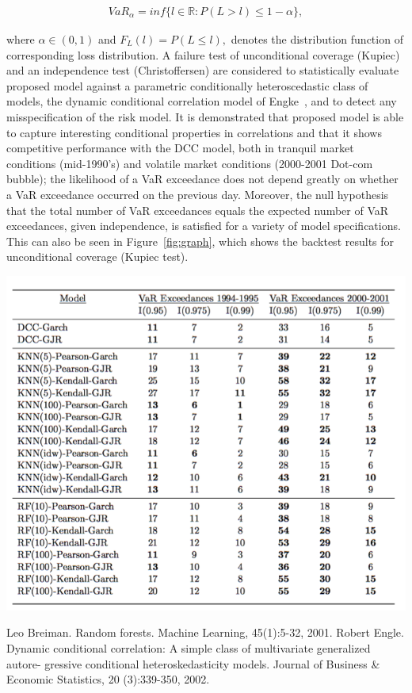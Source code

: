 \documentclass[a4paper,11pt]{article}
\begin{document}
\begin{slidetop}
\begin{multicols}{2}
\begin{align}
	VaR_{\alpha} = inf\{l \in \mathbb{R}:P(L>l) \le 1-\alpha\}, \nonumber
\end{align}

where $\alpha \in (0,1)$ and $F_L(l) = P(L \le l),$ denotes the distribution function of corresponding loss distribution. A failure test of unconditional coverage (Kupiec) and an independence test (Christoffersen) are considered to statistically evaluate proposed model against a parametric conditionally heteroscedastic class of models, the dynamic conditional correlation model of Engke~\cite{EN2002}, and to detect any misspecification of the risk model. It is demonstrated that proposed model is able to capture interesting conditional properties in correlations and that it shows competitive performance with the DCC model, both in tranquil market conditions (mid-1990's) and volatile market conditions (2000-2001 Dot-com bubble); the likelihood of a VaR exceedance does not depend greatly on whether a VaR exceedance occurred on the previous day. Moreover, the null hypothesis that the total number of VaR exceedances equals the expected number of VaR exceedances, given independence, is satisfied for a variety of model specifications. This can also be seen in Figure~\ref{fig:graph}, which shows the backtest results for unconditional coverage (Kupiec test).
\begin{center}
\includegraphics[scale=0.55]{kupiec_test}
\end{center}

\begin{thebibliography}{99}
Leo Breiman. Random forests. Machine Learning, 45(1):5-32, 2001.
Robert Engle. Dynamic conditional correlation: A simple class of multivariate generalized autore- gressive conditional heteroskedasticity models. Journal of Business \& Economic Statistics, 20 (3):339-350, 2002.
\end{thebibliography}
\end{multicols}
\end{slidetop}
\end{document}
